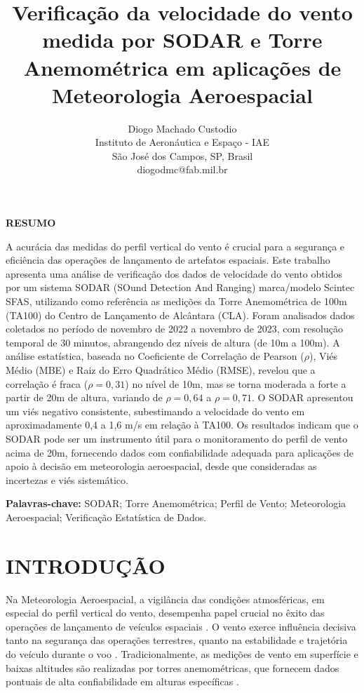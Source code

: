 \documentclass[12pt, a4paper, twocolumn]{article}
\title{Verificação da velocidade do vento medida por 
SODAR e Torre Anemométrica em aplicações
de Meteorologia Aeroespacial}
\author{Diogo Machado Custodio \\
Instituto de Aeronáutica e Espaço - IAE \\
São José dos Campos, SP, Brasil \\
diogodmc@fab.mil.br}
\date{}
\begin{document}
\onecolumn %

\maketitle

\begin{center}
\textbf{RESUMO}
\end{center}

\noindent A acurácia das medidas do perfil vertical do vento é crucial para a segurança e eficiência das operações de lançamento de artefatos espaciais. Este trabalho apresenta uma análise de verificação dos dados de velocidade do vento obtidos por um sistema SODAR (SOund Detection And Ranging) marca/modelo Scintec SFAS, utilizando como referência as medições da Torre Anemométrica de 100m (TA100) do Centro de Lançamento de Alcântara (CLA). Foram analisados dados coletados no período de novembro de 2022 a novembro de 2023, com resolução temporal de 30 minutos, abrangendo dez níveis de altura (de 10m a 100m). A análise estatística, baseada no Coeficiente de Correlação de Pearson ($\rho$), Viés Médio (MBE) e Raiz do Erro Quadrático Médio (RMSE), revelou que a correlação é fraca ($\rho=0,31$) no nível de 10m, mas se torna moderada a forte a partir de 20m de altura, variando de $\rho=0,64$ a $\rho=0,71$. O SODAR apresentou um viés negativo consistente, subestimando a velocidade do vento em aproximadamente 0,4 a 1,6 m/s em relação à TA100. Os resultados indicam que o SODAR pode ser um instrumento útil para o monitoramento do perfil de vento acima de 20m, fornecendo dados com confiabilidade adequada para aplicações de apoio à decisão em meteorologia aeroespacial, desde que consideradas as incertezas e viés sistemático.

\vspace{0.5cm}
\noindent \textbf{Palavras-chave:} SODAR; Torre Anemométrica; Perfil de Vento; Meteorologia Aeroespacial; Verificação Estatística de Dados.

\twocolumn %

\section{INTRODUÇÃO}

Na Meteorologia Aeroespacial, a vigilância das condições atmosféricas, em especial do perfil vertical do vento, desempenha papel crucial no êxito das operações de lançamento de veículos espaciais \cite{marques2005atividades}. O vento exerce influência decisiva tanto na segurança das operações terrestres, quanto na estabilidade e trajetória do veículo durante o voo \cite{fisch2015}. Tradicionalmente, as medições de vento em superfície e baixas altitudes são realizadas por torres anemométricas, que fornecem dados pontuais de alta confiabilidade em alturas específicas \cite{caruzzo2021aplicaccoes,custodio2018}.
\end{document}
